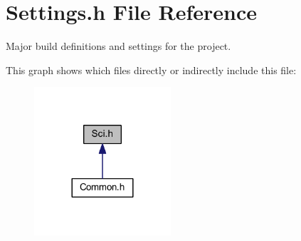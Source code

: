 \hypertarget{a00029}{\section{Settings.\-h File Reference}
\label{a00029}
}


Major build definitions and settings for the project.  


This graph shows which files directly or indirectly include this file\-:\nopagebreak
\begin{figure}[H]
\begin{center}
\leavevmode
\includegraphics[width=144pt]{a00053}
\end{center}
\end{figure}
